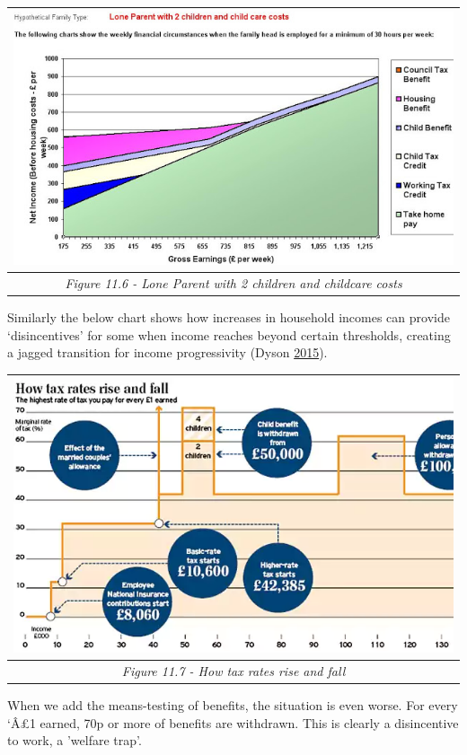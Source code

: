 \documentclass[]{tufte-handout}
\begin{document}
\begin{longtable}[]{@{}c@{}}
\toprule
\includegraphics{ChapterPictures/11-6-ParentingCosts.png}\tabularnewline
\midrule
\endhead
\emph{Figure 11.6 - Lone Parent with 2 children and childcare
costs}\tabularnewline
\bottomrule
\end{longtable}

Similarly the below chart shows how increases in household incomes can
provide `disincentives' for some when income reaches beyond certain
thresholds, creating a jagged transition for income progressivity (Dyson
\protect\hyperlink{ref-Dyson2015}{2015}).

\begin{longtable}[]{@{}c@{}}
\toprule
\includegraphics{ChapterPictures/11-7-TaxRates.png}\tabularnewline
\midrule
\endhead
\emph{Figure 11.7 - How tax rates rise and fall}\tabularnewline
\bottomrule
\end{longtable}

When we add the means-testing of benefits, the situation is even worse.
For every `Â£1 earned, 70p or more of benefits are withdrawn. This is
clearly a disincentive to work, a 'welfare trap'.
\end{document}
